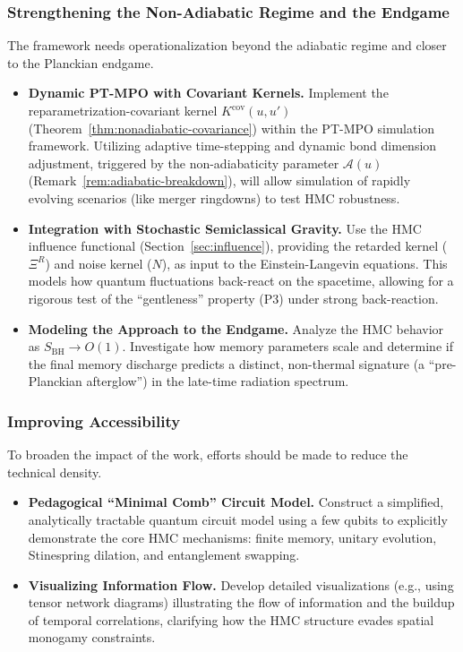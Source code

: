 \documentclass[11pt,a4paper]{article}
\theoremstyle{plain}
\theoremstyle{definition}
\theoremstyle{remark}
\begin{document}
\subsubsection{Strengthening the Non-Adiabatic Regime and the Endgame}
The framework needs operationalization beyond the adiabatic regime and closer to the Planckian endgame.
\begin{itemize}
    \item \textbf{Dynamic PT-MPO with Covariant Kernels.} Implement the reparametrization-covariant kernel $K^{\mathrm{cov}}(u,u')$ (Theorem~\ref{thm:nonadiabatic-covariance}) within the PT-MPO simulation framework. Utilizing adaptive time-stepping and dynamic bond dimension adjustment, triggered by the non-adiabaticity parameter $\mathcal{A}(u)$ (Remark~\ref{rem:adiabatic-breakdown}), will allow simulation of rapidly evolving scenarios (like merger ringdowns) to test HMC robustness.
    \item \textbf{Integration with Stochastic Semiclassical Gravity.} Use the HMC influence functional (Section~\ref{sec:influence}), providing the retarded kernel ($\Xi^R$) and noise kernel ($N$), as input to the Einstein-Langevin equations. This models how quantum fluctuations back-react on the spacetime, allowing for a rigorous test of the ``gentleness'' property (P3) under strong back-reaction.
    \item \textbf{Modeling the Approach to the Endgame.} Analyze the HMC behavior as $S_{\mathrm{BH}} \to O(1)$. Investigate how memory parameters scale and determine if the final memory discharge predicts a distinct, non-thermal signature (a ``pre-Planckian afterglow'') in the late-time radiation spectrum.
\end{itemize}

\subsubsection{Improving Accessibility}
To broaden the impact of the work, efforts should be made to reduce the technical density.
\begin{itemize}
    \item \textbf{Pedagogical ``Minimal Comb'' Circuit Model.} Construct a simplified, analytically tractable quantum circuit model using a few qubits to explicitly demonstrate the core HMC mechanisms: finite memory, unitary evolution, Stinespring dilation, and entanglement swapping.
    \item \textbf{Visualizing Information Flow.} Develop detailed visualizations (e.g., using tensor network diagrams) illustrating the flow of information and the buildup of temporal correlations, clarifying how the HMC structure evades spatial monogamy constraints.
\end{itemize}
\end{document}
